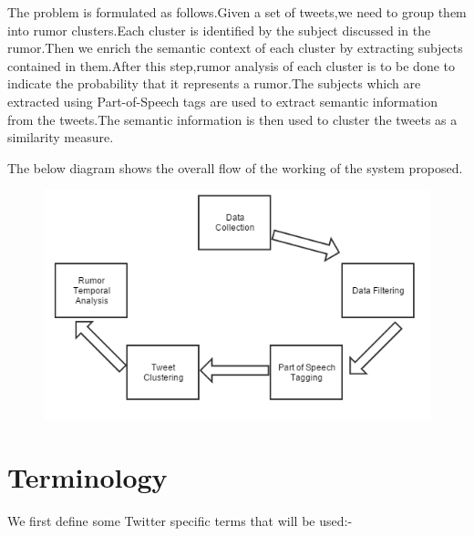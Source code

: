 			\par
			The problem is formulated as follows.Given a set of tweets,we need to group them into rumor clusters.Each cluster is identified by the subject discussed in the rumor.Then we enrich the semantic context of each cluster by extracting subjects contained in them.After this step,rumor analysis of each cluster is to be done to indicate the probability that it represents a rumor.The subjects which are extracted using Part-of-Speech tags are used to extract semantic information from the tweets.The semantic information is then used to cluster the tweets as a similarity measure.
			\\
			\par
			The below diagram shows the overall flow of the working of the system proposed.\\
			\begin{figure}[H]
				\centering
				\begin{minipage}{1\linewidth}
					\includegraphics[width=\linewidth]{images/block.png}
					\label{img1}
				\end{minipage}
			\end{figure}
			
		\clearpage	
			
		\section{Terminology}
		
		We first define some Twitter specific terms that will be used:-
		
